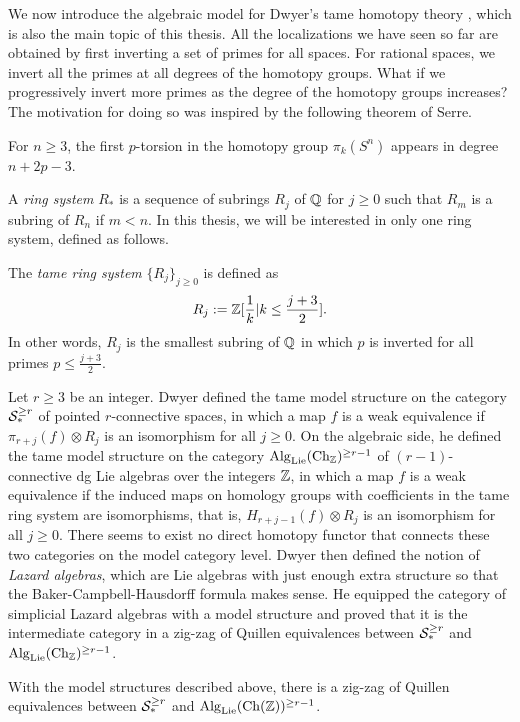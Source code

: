 We now introduce the algebraic model for Dwyer's tame homotopy theory \cite{Dwyer}, which is also the main topic of this thesis.
All the localizations we have seen so far are obtained by first inverting a set of primes for all spaces. For rational spaces, we invert all the primes at all degrees of the homotopy groups.
What if we progressively invert more primes as the degree of the homotopy groups increases?
The motivation for doing so was inspired by the following theorem of Serre.
\begin{theorem}[Serre]
	For $n\geq 3$, the first $p$-torsion in the homotopy group $\pi_{k}(S^{n})$ appears in degree $ n+2p-3$.
\end{theorem}

A \emph{ring system} $R_*$ is a sequence of subrings $R_j$ of ${\mathbb{Q}}$ for $j\geq 0$ such that  $R_m$ is a subring of $R_n$ if $m<n$. In this thesis, we will be interested in only one ring system, defined as follows.
\begin{definition}
\label{tame ring system}
The \emph{tame ring system} $\{R_j\}_{j\geq 0}$ is defined as 
$$
R_{j}:={\mathbb{Z}}[\frac{1}{k}|k\leq \frac{j+3}{2}].
$$
In other words, $R_j$ is the smallest subring of ${\mathbb{Q}}$ in which $p$ is inverted for all primes $p \leq \frac{j+3}{2}$.
\end{definition}

Let $r\geq 3$ be an integer. 
Dwyer \cite{Dwyer} defined the tame model structure on the category ${\mathcal{S}}^{\geq r}_*$ of pointed $r$-connective spaces, in which a map $f$ is a weak equivalence if $\pi_{r+j}(f)\otimes R_j$ is an isomorphism for all $j\geq 0$.
On the algebraic side, he defined the tame model structure on the category $\operatorname{Alg}_{\operatorname{Lie}}(\operatorname{Ch}_{\mathbb{Z}})^{\geq r-1}$ of $(r-1)$-connective dg Lie algebras over the integers ${\mathbb{Z}}$, in which a map $f$ is a weak equivalence if the induced maps on homology groups with coefficients in the tame ring system are isomorphisms, that is, $H_{r+j-1}(f)\otimes R_j$ is an isomorphism for all $j\geq 0$.
There seems to exist no direct homotopy functor that connects these two categories on the model category level.
Dwyer then defined the notion of \emph{Lazard algebras}, which are Lie algebras with just enough extra structure so that the Baker-Campbell-Hausdorff formula makes sense. He equipped the category of simplicial Lazard algebras with a model structure and proved that it is the intermediate category in a zig-zag of Quillen equivalences between ${\mathcal{S}}^{\geq r}_*$ and $\operatorname{Alg}_{\operatorname{Lie}}(\operatorname{Ch}_{\mathbb{Z}})^{\geq r-1}$.
\begin{theorem}
\cite{Dwyer}
With the model structures described above,
there is a zig-zag of Quillen equivalences between ${\mathcal{S}}^{\geq r}_*$ and $\operatorname{Alg}_{\operatorname{Lie}}(\operatorname{Ch}({\mathbb{Z}}))^{\geq r-1}$.
\end{theorem}

